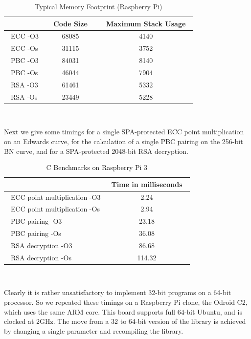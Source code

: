 \documentclass{llncs}
\begin{document}
\begin{table}
\centering
\begin{tabular}{|l|c|c|}
\hline
&~~Code Size~~&~Maximum Stack Usage~\\
\hline
~ECC  -O3 & 68085 & 4140  \\  %
~ECC  -Os & 31115 & 3752 \\   %
~PBC  -O3 & 84031 & 8140 \\   %
~PBC  -Os & 46044 & 7904 \\   %
~RSA  -O3 & 61461 & 5332 \\   %
~RSA  -Os & 23449 & 5228 \\   %
\hline
\end{tabular}
~\\
\caption{Typical Memory Footprint (Raspberry Pi)}
\label{footprint}
\end{table}


Next we give some timings for a single SPA-protected ECC point multiplication on an Edwards curve, for the calculation of a single PBC pairing on the 256-bit BN curve, and for a SPA-protected 2048-bit RSA decryption.

\begin{table}
\centering
\begin{tabular}{|l|c|}
\hline
&~Time in milliseconds~\\
\hline
~ECC point multiplication -O3 & 2.24  \\ %
~ECC point multiplication -Os & 2.94 \\ %
~PBC pairing -O3 & 23.18 \\ %
~PBC pairing -Os & 36.08 \\ %
~RSA decryption -O3 & 86.68 \\  %
~RSA decryption -Os & 114.32 \\  %
\hline
\end{tabular}
~\\
\caption{C Benchmarks on Raspberry Pi 3}
\label{cspeed32}
\end{table}

Clearly it is rather unsatisfactory to implement 32-bit programs on a 64-bit processor. So we repeated these timings on a Raspberry Pi clone, the Odroid C2, which uses the same ARM core. This board supports full
64-bit Ubuntu, and is clocked at 2GHz. The move from a 32 to 64-bit version of the library is achieved by changing a single parameter and recompiling the library. 
\end{document}
